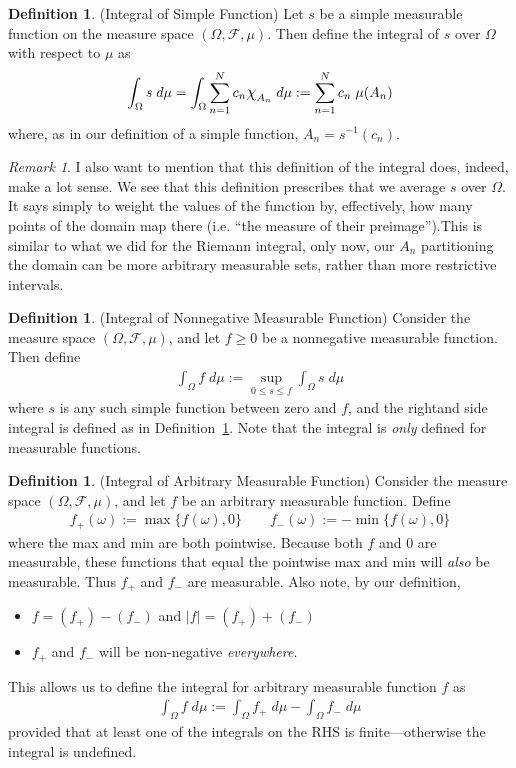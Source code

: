 \documentclass[12pt]{article}
\theoremstyle{plain}
\theoremstyle{definition}
\newtheorem{defn}[thm]{Definition}
\theoremstyle{remark}
\newtheorem*{rmk}{Remark}
\newcommand*{\Chi}{\mbox{\large$\chi$}} %
\newcommand{\sF}{\mathscr{F}}
\newcommand{\sumnN}{\sum^N_{n=1}}
\begin{document}
\begin{defn}(Integral of Simple Function)
\label{simpleint}
Let $s$ be a simple measurable function on the measure space
$(\Omega,\sF,\mu)$. Then define the integral of $s$ over $\Omega$ with
respect to $\mu$ as
\begin{equation}
    \int_\Omega s \; d\mu
    =
    \int_\Omega \sumnN c_n \Chi_{A_n} \; d\mu
    := \sumnN c_n \; \mu(A_n)
\end{equation}
where, as in our definition of a simple function,  $A_n = s^{-1}(c_n)$.
\end{defn}
\begin{rmk}
I also want to mention that this definition of the integral does,
indeed, make a lot sense. We see that this definition prescribes that we
average $s$ over $\Omega$.  It says simply to weight the values of the
function by, effectively, how many points of the domain map there (i.e.
``the measure of their preimage'').This is similar to what we did for
the Riemann integral, only now, our $A_n$ partitioning the domain can be
more arbitrary measurable sets, rather than more restrictive intervals.
\end{rmk}

\begin{defn}(Integral of Nonnegative Measurable Function)
Consider the measure space $(\Omega,\sF,\mu)$, and let $f\geq0$ be a
nonnegative measurable function. Then define
\begin{align*}
    \int_\Omega f \; d\mu := \sup_{0\leq s\leq f} \int_\Omega s \; d\mu
\end{align*}
where $s$ is any such simple function between zero and $f$, and the
rightand side integral is defined as in Definition~\ref{simpleint}. Note
that the integral is \emph{only} defined for measurable functions.
\end{defn}

\begin{defn}(Integral of Arbitrary Measurable Function)
Consider the measure space $(\Omega,\sF,\mu)$, and let $f$ be an
arbitrary measurable function. Define
\begin{align*}
    f_+(\omega) := \max\{f(\omega), 0\}
    \qquad
    f_-(\omega) := -\min\{f(\omega), 0\}
\end{align*}
where the max and min are both pointwise.
Because both $f$ and $0$ are measurable, these functions that equal the
pointwise max and min will \emph{also} be measurable. Thus $f_+$ and
$f_-$ are measurable. Also note, by our definition,
\begin{itemize}
  \item $f = (f_+) - (f_-)$ and $|f| = (f_+) + (f_-)$
  \item $f_+$ and $f_-$ will be non-negative \emph{everywhere}.
\end{itemize}
This allows us to define the integral for arbitrary measurable function
$f$ as
\begin{align*}
  \int_\Omega f\; d\mu := \int_\Omega f_+ \; d\mu - \int_\Omega f_- \; d\mu
\end{align*}
provided that at least one of the integrals on the RHS is
finite---otherwise the integral is undefined.
\end{defn}
\end{document}
